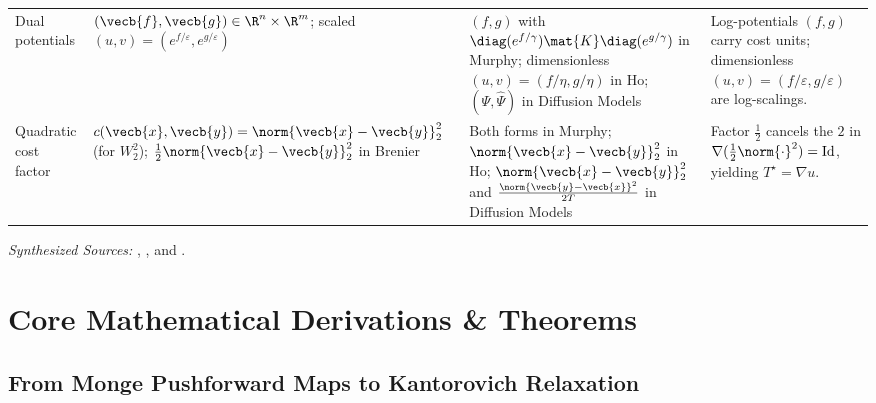 \documentclass[../../../../master.tex]{subfiles}
\begin{document}
\begin{crossbook}
\begin{center}
\begin{tabularx}{\linewidth}{@{}l>{\raggedright\arraybackslash}X>{\raggedright\arraybackslash}X>{\raggedright\arraybackslash}X@{}}
Dual potentials & $(\vecb{f}, \vecb{g}) \in \R^n \times \R^m$; scaled $(u, v) = (e^{f/\varepsilon}, e^{g/\varepsilon})$ & $(f, g)$ with $\diag(e^{f/\gamma})\mat{K}\diag(e^{g/\gamma})$ in Murphy; dimensionless $(u, v) = (f/\eta, g/\eta)$ in Ho; $(\Psi, \widehat{\Psi})$ in Diffusion Models & Log-potentials $(f,g)$ carry cost units; dimensionless $(u,v) = (f/\varepsilon, g/\varepsilon)$ are log-scalings. \\
Quadratic cost factor & $c(\vecb{x}, \vecb{y}) = \norm{\vecb{x}-\vecb{y}}_2^2$ (for $W_2^2$); $\frac{1}{2}\norm{\vecb{x}-\vecb{y}}_2^2$ in Brenier & Both forms in Murphy; $\norm{\vecb{x}-\vecb{y}}_2^2$ in Ho; $\norm{\vecb{x}-\vecb{y}}_2^2$ and $\frac{\norm{\vecb{y}-\vecb{x}}^2}{2T}$ in Diffusion Models & Factor $\frac{1}{2}$ cancels the $2$ in $\nabla(\frac{1}{2}\norm{\cdot}^2) = \mathrm{Id}$, yielding $T^\star = \nabla u$. \\
\bottomrule
\end{tabularx}
\end{center}
\vspace{2pt}
\footnotesize\emph{Synthesized Sources:} , , and .
\end{crossbook}

\section{Core Mathematical Derivations \& Theorems}
\label{sec:ot:derivations}

\subsection{From Monge Pushforward Maps to Kantorovich Relaxation}
\label{sec:ot:monge_kantorovich}
\end{document}
